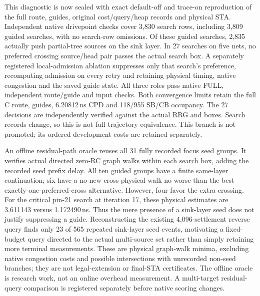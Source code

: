 This diagnostic is now sealed with exact default-off and trace-on reproduction of the full route, guides, original cost/query/heap records and physical STA. Independent native drivepoint checks cover 3,830 search rows, including 3,809 guided searches, with no search-row omissions. Of these guided searches, 2,835 actually push partial-tree sources on the sink layer. In 27 searches on five nets, no preferred crossing source/head pair passes the actual search box. A separately registered local-admission ablation suppresses only that search's preference, recomputing admission on every retry and retaining physical timing, native congestion and the saved guide state. All three roles pass native FULL, independent route/guide and input checks. Both convergence limits retain the full C route, guides, 6.20812\,ns CPD and 118/955 SB/CB occupancy. The 27 decisions are independently verified against the actual RRG and boxes. Search records change, so this is not full trajectory equivalence. This branch is not promoted; its ordered development costs are retained separately.

An offline residual-path oracle reuses all 31 fully recorded focus seed groups. It verifies actual directed zero-RC graph walks within each search box, adding the recorded seed prefix delay. All ten guided groups have a finite same-layer continuation; six have a no-new-cross physical walk no worse than the best exactly-one-preferred-cross alternative. However, four favor the extra crossing. For the critical pin-21 search at iteration 17, these physical estimates are 3.611143 versus 1.172490\,ns. Thus the mere presence of a sink-layer seed does not justify suppressing a guide. Reconstructing the existing 4,096-settlement reverse query finds only 23 of 565 repeated sink-layer seed events, motivating a fixed-budget query directed to the actual multi-source set rather than simply retaining more terminal measurements. These are physical graph-walk minima, excluding native congestion costs and possible intersections with unrecorded non-seed branches; they are not legal-extension or final-STA certificates. The offline oracle is research work, not an online overhead measurement. A multi-target residual-query comparison is registered separately before native scoring changes.
